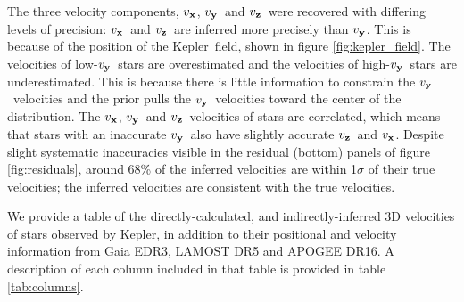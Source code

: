 \documentclass[]{aastex631}
\newcommand{\kepler}{{Kepler}}
\newcommand{\vx}{$v_{\bf x}$}
\newcommand{\vy}{$v_{\bf y}$}
\newcommand{\vz}{$v_{\bf z}$}
\begin{document}
The three velocity components, \vx, \vy\ and \vz\ were recovered with
differing levels of precision: \vx\ and \vz\ are inferred more precisely than
\vy.
This is because of the position of the \kepler\ field, shown in figure
\ref{fig:kepler_field}.
The velocities of low-\vy\ stars are overestimated and the velocities of
high-\vy\ stars are underestimated.
This is because there is little information to constrain the \vy\ velocities
and the prior pulls the \vy\ velocities toward the center of the distribution.
The \vx, \vy\ and \vz\ velocities of stars are correlated, which means that
stars with an inaccurate \vy\ also have slightly accurate \vz\ and \vx.
Despite slight systematic inaccuracies visible in the residual (bottom)
panels of figure \ref{fig:residuals}, around 68\% of the inferred velocities
are within 1$\sigma$ of their true velocities; the inferred velocities are
consistent with the true velocities.

We provide a table of the directly-calculated, and indirectly-inferred 3D
velocities of stars observed by Kepler, in addition to their positional and
velocity information from Gaia EDR3, LAMOST DR5 and APOGEE DR16.
A description of each column included in that table is provided in table
\ref{tab:columns}.
\end{document}
